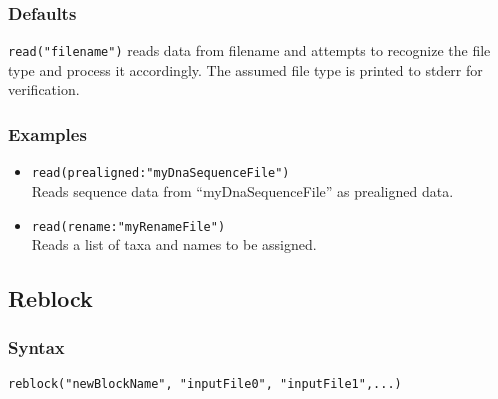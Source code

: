 \documentclass[11pt]{article}
\begin{document}
		\subsubsection{Defaults}
			\texttt{read("filename")} reads data from filename and attempts to recognize the file type
			and process it accordingly.  The assumed file type is printed to stderr for verification.
		\subsubsection{Examples}
				\begin{itemize}
					\item{\texttt{read(prealigned:"myDnaSequenceFile")}\\ Reads sequence data from ``myDnaSequenceFile'' as prealigned data.}
					\item{\texttt{read(rename:"myRenameFile")}\\ Reads a list of taxa and names to be assigned.}  
			\end{itemize}

	\subsection{Reblock}
	\subsubsection{Syntax}
	\texttt{reblock("newBlockName", "inputFile0", "inputFile1",...)}
\end{document}
